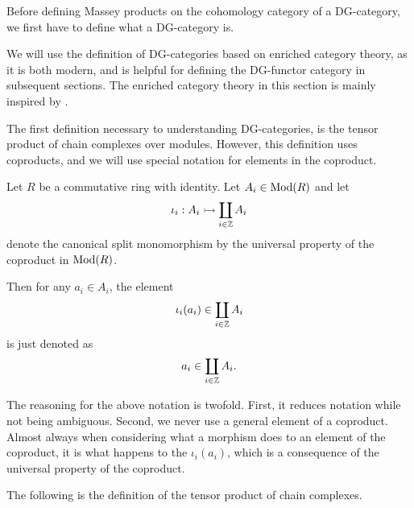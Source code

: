Before defining Massey products on the cohomology category of a DG-category, we first have to define what a DG-category is.

We will use the definition of DG-categories based on enriched category theory, as it is both modern, and is helpful for defining the DG-functor category in subsequent sections. The enriched category theory in this section is mainly inspired by \cite[Section 6.2]{Borceux_1994}.

The first definition necessary to understanding DG-categories, is the tensor product of chain complexes over modules. However, this definition uses coproducts, and we will use special notation for elements in the coproduct.

\begin{notation}
    \label{not:coprod}
    Let \( R \) be a commutative ring with identity. Let \( A_i \in \operatorname{Mod}(R) \) and let
    \[
        \iota_i: A_i \rightarrowtail \coprod_{i \in {\mathbb{Z}}} A_i
    \]
    denote the canonical split monomorphism by the universal property of the coproduct in \( \operatorname{Mod}(R) \).

    Then for any \( a_i \in A_i \), the element
    \[
        \iota_i(a_i) \in \coprod_{i \in {\mathbb{Z}}} A_i
    \]
    is just denoted as
    \[
        a_i \in \coprod_{i \in {\mathbb{Z}}} A_i.
    \]
\end{notation}

The reasoning for the above notation is twofold. First, it reduces notation while not being ambiguous. Second, we never use a general element of a coproduct. Almost always when considering what a morphism does to an element of the coproduct, it is what happens to the \( \iota_i(a_i) \), which is a consequence of the universal property of the coproduct.

The following is the definition of the tensor product of chain complexes.

